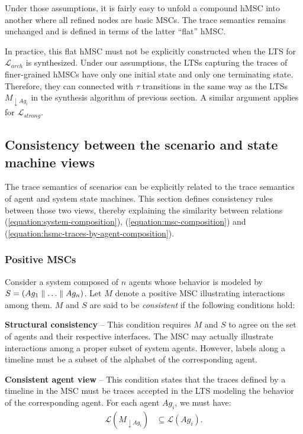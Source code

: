 Under those assumptions, it is fairly easy to unfold a compound hMSC into another where all refined nodes are basic MSCs. The trace semantics remains unchanged and is defined in terms of the latter ``flat'' hMSC. 

In practice, this flat hMSC must not be explicitly constructed when the LTS for $\mathcal{L}_{arch}$ is synthesized. Under our assumptions, the LTSs capturing the traces of finer-grained hMSCs have only one initial state and only one terminating state. Therefore, they can connected with $\tau$ transitions in the same way as the LTSs $M_{\downarrow Ag_i}$ in the synthesis algorithm of previous section. A similar argument applies for $\mathcal{L}_{strong}$.

\subsection{Consistency between the scenario and state machine views\label{subsection:background-scenario-consistency}}

The trace semantics of scenarios can be explicitly related to the trace semantics of agent and system state machines. This section defines consistency rules between those two views, thereby explaining the similarity between relations (\ref{equation:system-composition}), (\ref{equation:msc-composition}) and (\ref{equation:hsmc-traces-by-agent-composition}).

\subsubsection*{Positive MSCs}

Consider a system composed of $n$ agents whose behavior is modeled by $S = (Ag_1 \parallel \ldots \parallel Ag_n)$. Let $M$ denote a positive MSC illustrating interactions among them. $M$ and $S$ are said to be \emph{consistent} if the following conditions hold:

\noindent \textbf{Structural consistency} -- This condition requires $M$ and $S$ to agree on the set of agents and their respective interfaces. The MSC may actually illustrate interactions among a proper subset of system agents. However, labels along a timeline must be a subset of the alphabet of the corresponding agent.

\noindent \textbf{Consistent agent view} -- This condition states that the traces defined by a timeline in the MSC must be traces accepted in the LTS modeling the behavior of the corresponding agent. For each agent $Ag_i$, we must have:
\begin{align}\mathcal{L}(M_{\downarrow Ag_i}) & \subseteq \mathcal{L}(Ag_i)\label{condition:consistent-agent-view}.\end{align}

